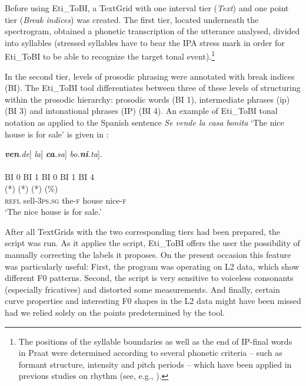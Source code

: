 Before using Eti\_ToBI, a TextGrid with one interval tier (\textit{Text}) and one point tier (\textit{Break indices}) was created. The first tier, located underneath the spectrogram, obtained a phonetic transcription of the utterance analysed, divided into syllables (stressed syllables have to bear the IPA stress mark in order for Eti\_ToBI to be able to recognize the target tonal event).\footnote{The positions of the syllable boundaries as well as the end of IP-final words in Praat were determined according to several phonetic criteria -- such as formant structure, intensity and pitch periods -- which have been applied in previous studies on rhythm (see, e.g., \citealt{WhiteMattys2007, GrabeLow2002, GabrielKireva2014b}).}



In the second tier, levels of prosodic phrasing were annotated with break indices (BI). The Eti\_ToBI tool differentiates between three of these levels of structuring within the prosodic hierarchy: prosodic words (BI 1), intermediate phrases (ip) (BI 3) and intonational phrases (IP) (BI 4). An example of Eti\_ToBI tonal notation as applied to the Spanish sentence \textit{Se vende la casa bonita} ‘The nice house is for sale’ is given in :


\ea\label{ex:3:1} \glllll {\textit{Se}]} {\textit{\textbf{ven}.de}]} {\textit{la}]}    {\textit{\textbf{ca}.sa}]} {\textit{bo.\textbf{ni}.ta}]}.\\
     {\hphantom{Se}\textbar}            {\hphantom{ven.de}\textbar}            {\hphantom{la}\textbar}               {\hphantom{ca.sa}\textbar}                   {\hphantom{bo.ni.ta}\textbar}\\
   {\hphantom{Se}BI 0}         {\hphantom{ven.de}BI 1}        {\hphantom{la}BI 0}           {\hphantom{ca.sa}BI 1}      {\hphantom{bo.ni.ta}BI 4}\\
          {}   (*)    {}   (*)            {(*)  (\%)}\\
\textsc{refl}   sell-\textsc{3ps.sg}    the\textsc{{}-f}     house         nice\textsc{{}-f}\\


\glt ‘The nice house is for sale.’
\z

After all TextGrids with the two corresponding tiers had been prepared, the script was run. As it applies the script, Eti\_ToBI offers the user the possibility of manually correcting the labels it proposes. On the present occasion this feature was particularly useful: First, the program was operating on L2 data, which show different F0 patterns. Second, the script is very sensitive to voiceless consonants (especially fricatives) and distorted some measurements. And finally, certain curve properties and interesting F0 shapes in the L2 data might have been missed had we relied solely on the points predetermined by the tool.


